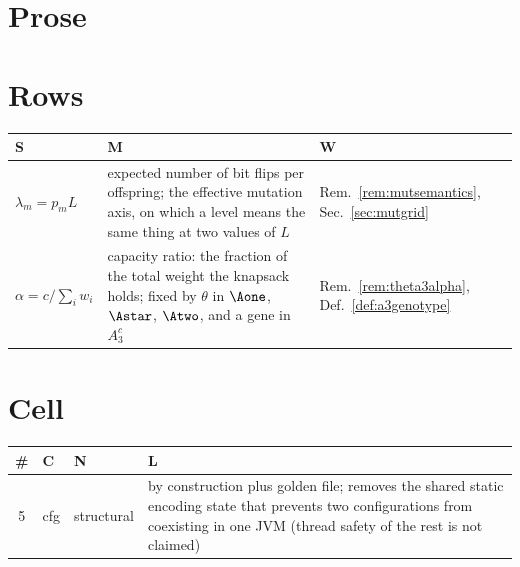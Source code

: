 

\section{Prose}
\section{Rows}\begin{small}\begin{longtable}{@{}p{2.6cm}p{7.6cm}p{5.2cm}@{}}
\toprule S & M & W \\ \midrule \endhead
$\lambda_m=p_mL$ & expected number of bit flips per offspring; the effective mutation axis, on which a level means the same thing at two values of $L$ & Rem.~\ref{rem:mutsemantics}, Sec.~\ref{sec:mutgrid} \\
$\alpha=c/\sum_iw_i$ & capacity ratio: the fraction of the total weight the knapsack holds; fixed by $\theta$ in $\Aone$, $\Astar$, $\Atwo$, and a gene in $A_3^{c}$ & Rem.~\ref{rem:theta3alpha}, Def.~\ref{def:a3genotype} \\
\bottomrule\end{longtable}\end{small}
\section{Cell}\begin{tabular}{@{}cp{5.2cm}p{2.6cm}p{5.0cm}@{}}
\toprule \# & C & N & L \\ \midrule
5 & cfg & structural & by construction plus golden file; removes the shared static encoding state that prevents two configurations from coexisting in one JVM (thread safety of the rest is not claimed) \\
\bottomrule\end{tabular}